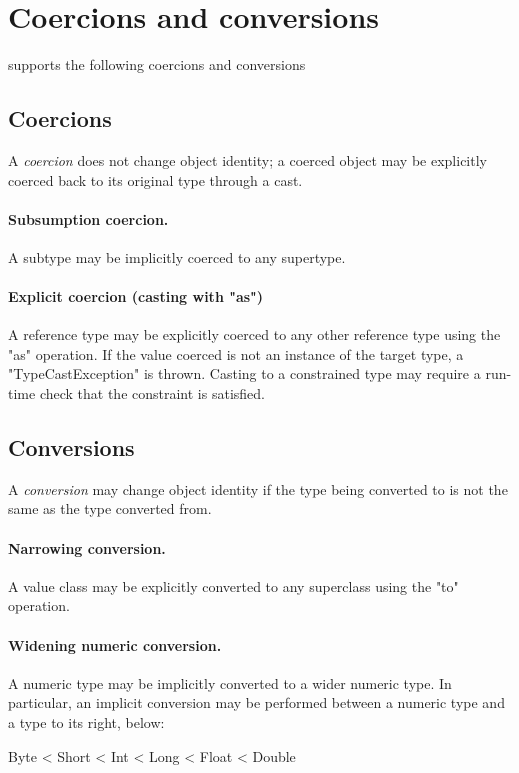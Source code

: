 \section{Coercions and conversions}
\label{XtenConversions}
\label{User-definedCoercions}

\XtenCurrVer{} supports the following coercions and conversions

\subsection{Coercions}

A {\em coercion} does not change object identity;
a coerced object may be explicitly coerced back to its original
type through a cast.

\paragraph{Subsumption coercion.}
A subtype may be implicitly coerced to any supertype.

\paragraph{Explicit coercion (casting with \xcd"as")}
A reference type may be explicitly coerced to any other
reference type using the \xcd"as" operation.
If the value coerced is not an instance of the target type,
a \xcd"TypeCastException" is thrown.  Casting to a constrained
type may require a run-time check that the constraint is
satisfied.

\subsection{Conversions}

A {\em conversion} may change object identity if the type being
converted to is not the same as the type converted from.

\paragraph{Narrowing conversion.}
A value class may be explicitly converted to any superclass
using the \xcd"to" operation.


\paragraph{Widening numeric conversion.}
A numeric type may be implicitly converted to a wider
numeric type.
In particular, an implicit conversion may be performed between
a numeric type and a type to its right, below:
\begin{xten}
Byte < Short < Int < Long < Float < Double
\end{xten}

